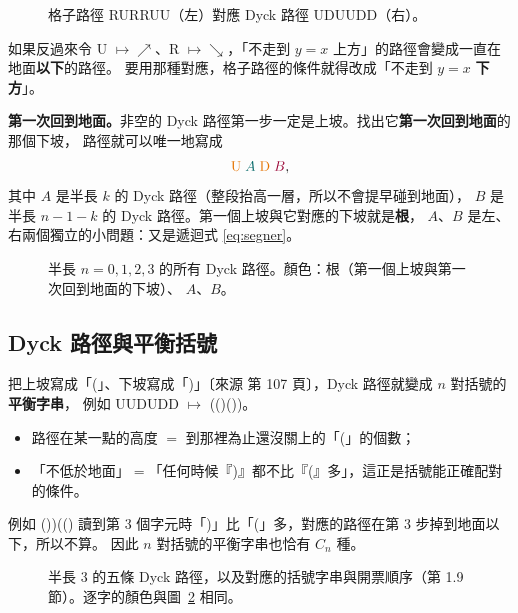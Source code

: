 \documentclass[11pt,a4paper]{article}
\newcommand{\src}[1]{{\small\color{gray!70!black}〔來源 #1〕}}  %
\begin{document}
\begin{figure}[H]
\centering
\FigLatticeToDyck
\caption{格子路徑 RURRUU（左）對應 Dyck 路徑 UDUUDD（右）。}
\label{fig:lattice2dyck}
\end{figure}

\begin{notebox}[注意方向]
如果反過來令 U $\mapsto\nearrow$、R $\mapsto\searrow$，「不走到 $y=x$ 上方」的路徑會變成一直在地面\textbf{以下}的路徑。
要用那種對應，格子路徑的條件就得改成「不走到 $y=x$ \textbf{下方}」。
\end{notebox}

\textbf{第一次回到地面。}非空的 Dyck 路徑第一步一定是上坡。找出它\textbf{第一次回到地面}的那個下坡，
路徑就可以唯一地寫成
\[
\textcolor{cTop}{\mathrm{U}}\;\textcolor{cLeft}{A}\;\textcolor{cTop}{\mathrm{D}}\;\textcolor{cRight}{B},
\]
其中 $A$ 是半長 $k$ 的 Dyck 路徑（整段抬高一層，所以不會提早碰到地面），
$B$ 是半長 $n-1-k$ 的 Dyck 路徑。第一個上坡與它對應的下坡就是\textbf{根}，
$A$、$B$ 是左、右兩個獨立的小問題：又是遞迴式 \eqref{eq:segner}。

\begin{figure}[H]
\centering
\FigDyckTable
\caption{半長 $n=0,1,2,3$ 的所有 Dyck 路徑。顏色：\textcolor{cTop}{根}（第一個上坡與第一次回到地面的下坡）、
\textcolor{cLeft}{$A$}、\textcolor{cRight}{$B$}。}
\label{fig:dyck}
\end{figure}

\subsection{Dyck 路徑與平衡括號}

把上坡寫成「(」、下坡寫成「)」\src{第 107 頁}，Dyck 路徑就變成 $n$ 對括號的\textbf{平衡字串}，
例如 UUDUDD $\mapsto$ (()())。
\begin{itemize}
  \item 路徑在某一點的高度 $=$ 到那裡為止還沒關上的「(」的個數；
  \item 「不低於地面」$=$「任何時候『)』都不比『(』多」，這正是括號能正確配對的條件。
\end{itemize}
例如 ())(() 讀到第 3 個字元時「)」比「(」多，對應的路徑在第 3 步掉到地面以下，所以不算。
因此 $n$ 對括號的平衡字串也恰有 $C_n$ 種。

\begin{figure}[H]
\centering
\FigDyckWords
\caption{半長 3 的五條 Dyck 路徑，以及對應的括號字串與開票順序（第 1.9 節）。逐字的顏色與圖~\ref{fig:dyck} 相同。}
\label{fig:dyckwords}
\end{figure}
\end{document}
